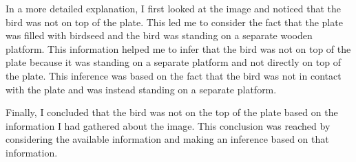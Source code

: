 \begin{enumerate}
        In a more detailed explanation, I first looked at the image and noticed that the bird was not on top of the plate. This led me to consider the fact that the plate was filled with birdseed and the bird was standing on a separate wooden platform. This information helped me to infer that the bird was not on top of the plate because it was standing on a separate platform and not directly on top of the plate. This inference was based on the fact that the bird was not in contact with the plate and was instead standing on a separate platform.
        
        Finally, I concluded that the bird was not on the top of the plate based on the information I had gathered about the image. This conclusion was reached by considering the available information and making an inference based on that information.
    \end{enumerate}
